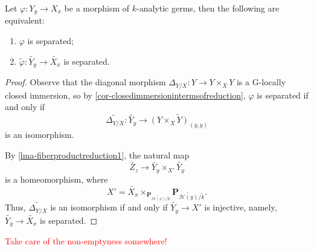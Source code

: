 \begin{corollary}\label{cor-separatednessreductioncri}
    Let $\varphi:Y_y\rightarrow X_x$ be a morphism of $k$-analytic germs, then the following are equivalent:
    \begin{enumerate}
        \item $\varphi$ is separated;
        \item $\tilde{\varphi}:\widetilde{Y_y}\rightarrow \widetilde{X_x}$ is separated.
    \end{enumerate}
\end{corollary}
\begin{proof}
    Observe that the diagonal morphism $\Delta_{Y/X}:Y\rightarrow Y\times_X Y$ is a G-locally closed immersion, so by \cref{cor-closedimmersionintermsofreduction}, $\varphi$ is separated if and only if 
    \[
        \widetilde{\Delta_{Y/X}}: \widetilde{Y_y}\rightarrow \widetilde{(Y\times_X Y)_{(y,y)}} 
    \] 
    is an isomorphism.

    By \cref{lma-fiberproductreduction1}, the natural map
    \[
        \widetilde{Z_z}\rightarrow \widetilde{Y_y}\times_{X'}  \widetilde{Y_y}
    \]
    is a homeomorphism, where 
    \[
        X'=\widetilde{X_x}\times_{\mathbf{P}_{\widetilde{\mathscr{H}(x)}/\tilde{k}}}\mathbf{P}_{\widetilde{\mathscr{H}(y)}/\tilde{k}}.
    \]
    Thus, $\widetilde{\Delta_{Y/X}}$ is an isomorphism if and only if $\widetilde{Y_y}\rightarrow X'$ is injective, namely, $\widetilde{Y_y}\rightarrow \widetilde{X_x}$ is separated.
\end{proof}

\textcolor{red}{Take care of the non-emptyness somewhere!}

